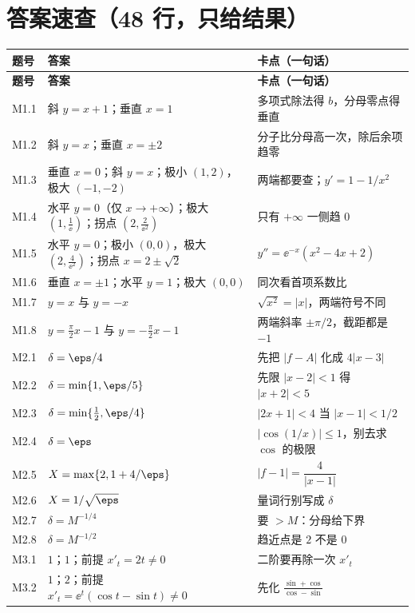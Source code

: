 \documentclass[11pt,a4paper]{ctexart}
\begin{document}
\section{答案速查（48 行，只给结果）}
{\footnotesize
\begin{longtable}{@{}p{1.4cm}p{7.4cm}p{7.0cm}@{}}
\toprule
\textbf{题号} & \textbf{答案} & \textbf{卡点（一句话）} \\
\midrule
\endfirsthead
\toprule
\textbf{题号} & \textbf{答案} & \textbf{卡点（一句话）} \\
\midrule
\endhead
\bottomrule
\endlastfoot
M1.1 & 斜 $y=x+1$；垂直 $x=1$ & 多项式除法得 $b$，分母零点得垂直 \\
M1.2 & 斜 $y=x$；垂直 $x=\pm2$ & 分子比分母高一次，除后余项趋零 \\
M1.3 & 垂直 $x=0$；斜 $y=x$；极小 $(1,2)$，极大 $(-1,-2)$ & 两端都要查；$y'=1-1/x^{2}$ \\
M1.4 & 水平 $y=0$（仅 $x\to+\infty$）；极大 $\left(1,\tfrac1\ee\right)$；拐点 $\left(2,\tfrac{2}{\ee^{2}}\right)$ & 只有 $+\infty$ 一侧趋 0 \\
M1.5 & 水平 $y=0$；极小 $(0,0)$，极大 $\left(2,\tfrac{4}{\ee^{2}}\right)$；拐点 $x=2\pm\sqrt2$ & $y''=\ee^{-x}(x^{2}-4x+2)$ \\
M1.6 & 垂直 $x=\pm1$；水平 $y=1$；极大 $(0,0)$ & 同次看首项系数比 \\
M1.7 & $y=x$ 与 $y=-x$ & $\sqrt{x^{2}}=|x|$，两端符号不同 \\
M1.8 & $y=\tfrac{\pi}{2}x-1$ 与 $y=-\tfrac{\pi}{2}x-1$ & 两端斜率 $\pm\pi/2$，截距都是 $-1$ \\
M2.1 & $\delta=\eps/4$ & 先把 $|f-A|$ 化成 $4|x-3|$ \\
M2.2 & $\delta=\min\{1,\eps/5\}$ & 先限 $|x-2|<1$ 得 $|x+2|<5$ \\
M2.3 & $\delta=\min\{\tfrac12,\eps/4\}$ & $|2x+1|<4$ 当 $|x-1|<1/2$ \\
M2.4 & $\delta=\eps$ & $|\cos(1/x)|\le1$，别去求 $\cos$ 的极限 \\
M2.5 & $X=\max\{2,1+4/\eps\}$ & $|f-1|=\dfrac{4}{|x-1|}$ \\
M2.6 & $X=1/\sqrt{\eps}$ & 量词行别写成 $\delta$ \\
M2.7 & $\delta=M^{-1/4}$ & 要 $>M$：分母给下界 \\
M2.8 & $\delta=M^{-1/2}$ & 趋近点是 $2$ 不是 $0$ \\
M3.1 & $1$；$1$；前提 $x'_t=2t\ne0$ & 二阶要再除一次 $x'_t$ \\
M3.2 & $1$；$2$；前提 $x'_t=\ee^{t}(\cos t-\sin t)\ne0$ & 先化 $\tfrac{\sin+\cos}{\cos-\sin}$ \\

\end{longtable}}
\end{document}
